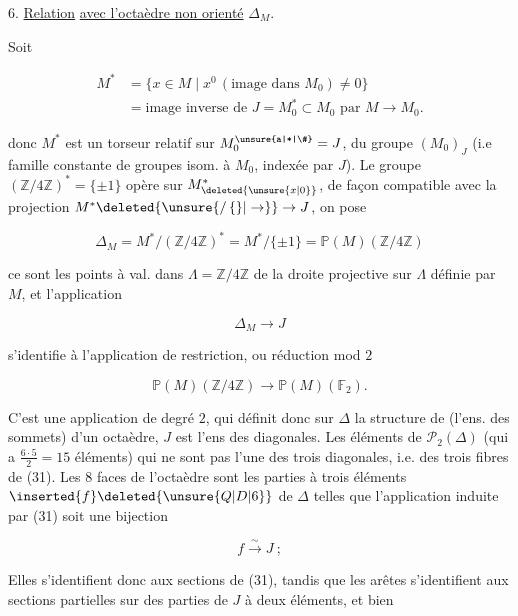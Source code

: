 6. \uline{Relation} \uline{avec l'octaèdre non orienté} $\Delta_M$.

Soit

\[
\begin{aligned}
M^*&=\{x\in M\mid x^0\,(\text{image dans }M_0)\ne0\}\\
&=\text{image inverse de }J=M_0^*\subset M_0\text{ par } M\longrightarrow M_0 .
\end{aligned}\tag*{(29)}
\]

 donc $M^*$ est un torseur relatif sur $M_0^{\unsure{a|*|\#}}=J$, du groupe $(M_0)_J$ (i.e famille constante de groupes isom. à $M_0$, indexée par $J$). Le groupe $(\mathbb Z/4\mathbb Z)^*=\{\pm1\}$ opère sur $M^{*}_{\deleted{\unsure{x|0}}}$, de façon compatible avec la projection $M^*\deleted{\unsure{/\,\{\}|\to}}\to J$, on pose

\[
\Delta_M=M^*/(\mathbb Z/4\mathbb Z)^*=M^*/\{\pm1\}=\mathbb P(M)(\mathbb Z/4\mathbb Z)\tag*{(30)}
\]

ce sont les points  à val. dans $\Lambda=\mathbb Z/4\mathbb Z$ de la droite projective sur $\Lambda$ définie par $M$, et l'application  

\[
\Delta_M\longrightarrow J \tag*{(31)}
\]

s'identifie à l'application de restriction, ou réduction mod $2$

\[
\mathbb P(M)(\mathbb Z/4\mathbb Z)\longrightarrow\mathbb P(M)(\mathbb F_2).
\]

C'est une application de degré $2$, qui définit donc sur $\Delta$ la structure de (l'ens. des sommets) d'un octaèdre,  $J$ est l'ens des diagonales. Les   éléments de $\mathcal P_2(\Delta)$ (qui a $\frac{6\cdot5}{2}=15$ éléments) qui ne sont pas  l'une des trois diagonales, i.e. des trois fibres de (31). Les $8$ faces de l'octaèdre sont les parties à trois éléments $\inserted{f}\deleted{\unsure{Q|D|6}}$ de $\Delta$ telles que l'application induite par (31) soit une bijection

\[
f\xrightarrow{\sim}J\ ; \tag*{(32)}
\]

Elles s'identifient donc aux sections de (31), tandis que les arêtes s'identifient aux sections partielles sur des parties de $J$ à deux éléments, et bien
